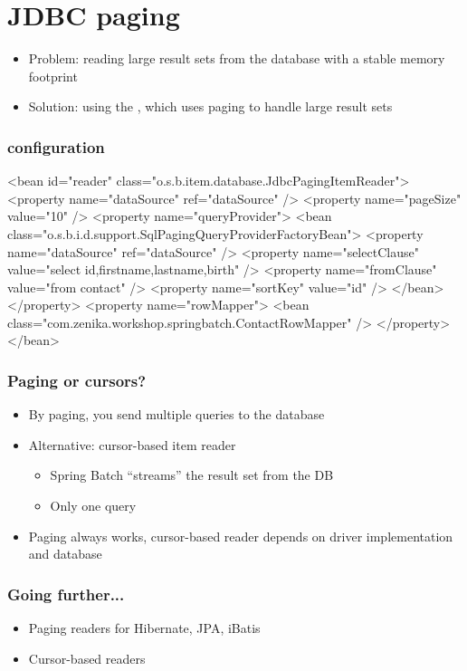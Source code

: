 \section{JDBC paging}

\begin{frame}
 \begin{itemize}
  \item Problem: reading large result sets from the database with a stable memory footprint 
  \item Solution: using the , which uses paging to handle large result sets
 \end{itemize}
\end{frame}


\begin{frame}[fragile]
\frametitle{ configuration}

\begin{xmlcode}
<bean id="reader"
      class="o.s.b.item.database.JdbcPagingItemReader">
  <property name="dataSource" ref="dataSource" />
  <property name="pageSize" value="10" />
  <property name="queryProvider">
    <bean class="o.s.b.i.d.support.SqlPagingQueryProviderFactoryBean">
      <property name="dataSource" ref="dataSource" />
      <property name="selectClause" 
                value="select id,firstname,lastname,birth" />
      <property name="fromClause" value="from contact" />
      <property name="sortKey" value="id" />
    </bean>
  </property>
  <property name="rowMapper">
    <bean class="com.zenika.workshop.springbatch.ContactRowMapper" />
  </property>
</bean>
\end{xmlcode}
\end{frame}

\begin{frame}
\frametitle{Paging or cursors?}
\begin{itemize}
 \item By paging, you send multiple queries to the database
 \item Alternative: cursor-based item reader
 \begin{itemize}
  \item Spring Batch “streams” the result set from the DB
  \item Only one query
 \end{itemize}
 \item Paging always works, cursor-based reader depends on driver implementation and database
\end{itemize}
\end{frame}

\begin{frame}
 \frametitle{Going further...}
 \begin{itemize}
  \item Paging readers for Hibernate, JPA, iBatis
  \item Cursor-based readers
 \end{itemize}
\end{frame}

